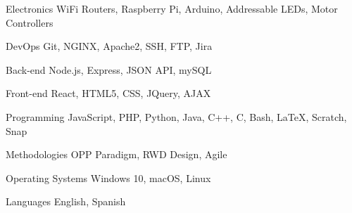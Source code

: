 

\begin{cvskills}

  \cvskill
    {Electronics} %
    {WiFi Routers, Raspberry Pi, Arduino, Addressable LEDs, Motor Controllers } %

  \cvskill
    {DevOps} %
    {Git, NGINX, Apache2, SSH, FTP, Jira} %

  \cvskill
    {Back-end} %
    {Node.js, Express, JSON API, mySQL} %

  \cvskill
    {Front-end} %
    {React, HTML5, CSS, JQuery, AJAX} %

  \cvskill
    {Programming} %
    {JavaScript, PHP, Python, Java, C++, C, Bash, LaTeX, Scratch, Snap} %

  \cvskill
    {Methodologies} %
    {OPP Paradigm, RWD Design, Agile} %

  \cvskill
    {Operating Systems} %
    {Windows 10, macOS, Linux} %


  \cvskill
    {Languages} %
    {English, Spanish} %


\end{cvskills}
